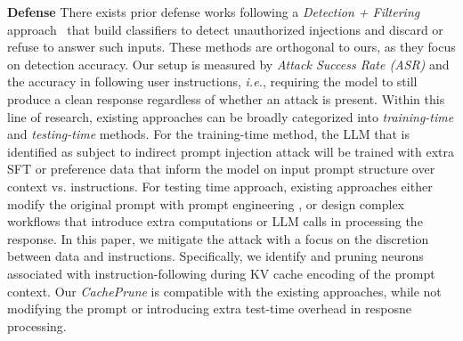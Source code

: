 \noindent\textbf{Defense}
 There exists prior defense works following a \textit{Detection + Filtering} approach~\cite{abdelnabi2025get, piguard, embeddingdetect} that build classifiers to detect unauthorized injections and discard or refuse to answer such inputs. These methods are orthogonal to ours, as they focus on detection accuracy.
Our setup is measured by \textit{Attack Success Rate (ASR)} and the accuracy in following user instructions, \emph{i.e.}, requiring the model to still produce a clean response regardless of whether an attack is present.
Within this line of research, existing approaches can be broadly categorized into \textit{training-time} and \textit{testing-time} methods.
For the training-time method, the LLM that is identified as subject to indirect prompt injection attack will be trained with extra SFT \cite{chen2024struq} or preference data \cite{chen2024aligning} that inform the model on input prompt structure over context vs. instructions.
For testing time approach, existing approaches either modify the original prompt with prompt engineering   \cite{wu2023defending, hines2024defending}, or design complex workflows \cite{wang2024fath,jia2025task} that introduce extra computations or LLM calls in processing the response.
In this paper, we mitigate the attack with a focus on the discretion between data and instructions.
Specifically, we identify and pruning neurons associated with
instruction-following during KV cache encoding of the prompt context.
Our \textit{CachePrune} is compatible with the existing approaches, while not modifying the prompt or introducing extra test-time overhead in resposne processing. 



